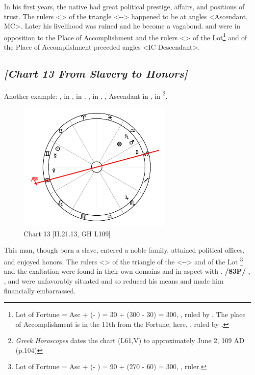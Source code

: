 In his first years, the native had great political prestige, affairs, and positions of trust. The rulers <\Venus\xspace \Moon> of the triangle <\Taurus-\Virgo-\Capricorn> happened to be at angles <Ascendant, MC>. Later his livelihood was ruined and he become a vagabond. \Mars\xspace and \Mercury\xspace were in opposition to the Place of Accomplishment and the rulers <\Saturn\xspace \Jupiter> of the Lot\footnote{Lot of Fortune = Asc + (\Moon\xspace\xspace - \Sun) = 30 + (300 - 30) = 300, \Aquarius, ruled by \Saturn. The place of Accomplishment is in the 11th from the Fortune, here, \Sagittarius, ruled by \Jupiter.}
 and of the Place of Accomplishment preceded angles <IC Descendant>.
 
\newpage
\subsection*{\textit{[Chart 13 From Slavery to Honors]}}

Another example: \Sun, \Mercury\xspace in \Gemini,\Moon\xspace in \Capricorn, \Saturn, \Mars\xspace in \Aquarius, \Venus, Ascendant in \Cancer, \Jupiter\xspace in \Scorpio
\footnote{\textit{Greek Horoscopes} dates the chart (L61,V) to approximately June 2, 109 AD (p.104)}.

\clearpage
\begin{figure}
\centering
\vspace{-20pt}
\includegraphics[width=0.68\textwidth]{charts/2_21_13}
\caption{Chart 13 [II.21.13, GH L109]}
\label{fig:chart13}
\end{figure}

This man, though born a slave, entered a noble family, attained political offices, and enjoyed honors. The rulers <\Saturn\xspace \Mercury> of the triangle of the \Sun\xspace <\Gemini-\Libra-\Aquarius> and of the Lot
\footnote{Lot of Fortune = Asc + (\Moon\xspace\xspace - \Sun) = 90 + (270 - 60) = 300, \Aquarius, \Saturn\xspace ruler.}
 and the exaltation were found in their own domains and in aspect with
\Jupiter. \textbf{/83P/} \Mars, \Saturn, and \Mercury\xspace were unfavorably situated and so reduced his means and made
him financially embarrassed.

